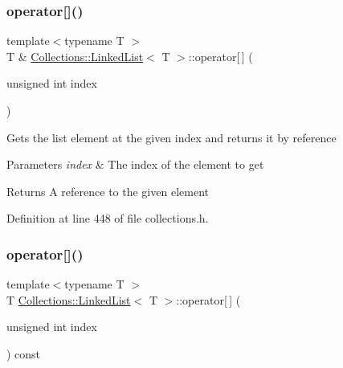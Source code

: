 \hypertarget{class_collections_1_1_linked_list_adb503bc22d6d74144f93bbd59064bba2}{}\label{class_collections_1_1_linked_list_adb503bc22d6d74144f93bbd59064bba2} 
\subsubsection{\texorpdfstring{operator[]()}{operator[]()}\hspace{0.1cm}{\footnotesize\ttfamily [1/2]}}
{\footnotesize\ttfamily template$<$typename T $>$ \\
T \& \hyperlink{class_collections_1_1_linked_list}{Collections\+::\+Linked\+List}$<$ T $>$\+::operator\mbox{[}$\,$\mbox{]} (\begin{DoxyParamCaption}\item[{unsigned int}]{index }\end{DoxyParamCaption})}

Gets the list element at the given index and returns it by reference 
\begin{DoxyParams}{Parameters}
{\em index} & The index of the element to get \\
\hline
\end{DoxyParams}
\begin{DoxyReturn}{Returns}
A reference to the given element 
\end{DoxyReturn}


Definition at line 448 of file collections.\+h.

\hypertarget{class_collections_1_1_linked_list_a6eb74c0ff9720d297ae076b4e218a655}{}\label{class_collections_1_1_linked_list_a6eb74c0ff9720d297ae076b4e218a655} 
\subsubsection{\texorpdfstring{operator[]()}{operator[]()}\hspace{0.1cm}{\footnotesize\ttfamily [2/2]}}
{\footnotesize\ttfamily template$<$typename T $>$ \\
T \hyperlink{class_collections_1_1_linked_list}{Collections\+::\+Linked\+List}$<$ T $>$\+::operator\mbox{[}$\,$\mbox{]} (\begin{DoxyParamCaption}\item[{unsigned int}]{index }\end{DoxyParamCaption}) const}

